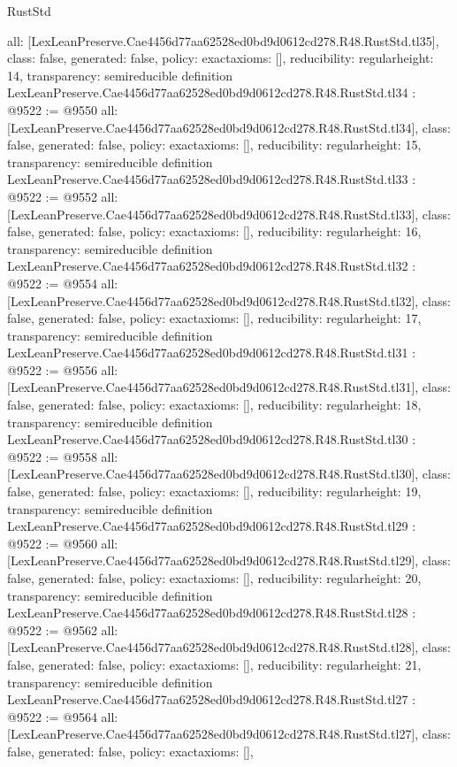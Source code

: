 \begin{lexlean}{RustStd}
\begin{coremodule}
{  all: [LexLeanPreserve.Cae4456d77aa62528ed0bd9d0612cd278.R48.RustStd.tl35],
  class: false,
  generated: false,
  policy: exact{axioms: []},
  reducibility: regular{height: 14},
  transparency: semireducible
}
definition LexLeanPreserve.Cae4456d77aa62528ed0bd9d0612cd278.R48.RustStd.tl34 : @9522 := @9550 {
  all: [LexLeanPreserve.Cae4456d77aa62528ed0bd9d0612cd278.R48.RustStd.tl34],
  class: false,
  generated: false,
  policy: exact{axioms: []},
  reducibility: regular{height: 15},
  transparency: semireducible
}
definition LexLeanPreserve.Cae4456d77aa62528ed0bd9d0612cd278.R48.RustStd.tl33 : @9522 := @9552 {
  all: [LexLeanPreserve.Cae4456d77aa62528ed0bd9d0612cd278.R48.RustStd.tl33],
  class: false,
  generated: false,
  policy: exact{axioms: []},
  reducibility: regular{height: 16},
  transparency: semireducible
}
definition LexLeanPreserve.Cae4456d77aa62528ed0bd9d0612cd278.R48.RustStd.tl32 : @9522 := @9554 {
  all: [LexLeanPreserve.Cae4456d77aa62528ed0bd9d0612cd278.R48.RustStd.tl32],
  class: false,
  generated: false,
  policy: exact{axioms: []},
  reducibility: regular{height: 17},
  transparency: semireducible
}
definition LexLeanPreserve.Cae4456d77aa62528ed0bd9d0612cd278.R48.RustStd.tl31 : @9522 := @9556 {
  all: [LexLeanPreserve.Cae4456d77aa62528ed0bd9d0612cd278.R48.RustStd.tl31],
  class: false,
  generated: false,
  policy: exact{axioms: []},
  reducibility: regular{height: 18},
  transparency: semireducible
}
definition LexLeanPreserve.Cae4456d77aa62528ed0bd9d0612cd278.R48.RustStd.tl30 : @9522 := @9558 {
  all: [LexLeanPreserve.Cae4456d77aa62528ed0bd9d0612cd278.R48.RustStd.tl30],
  class: false,
  generated: false,
  policy: exact{axioms: []},
  reducibility: regular{height: 19},
  transparency: semireducible
}
definition LexLeanPreserve.Cae4456d77aa62528ed0bd9d0612cd278.R48.RustStd.tl29 : @9522 := @9560 {
  all: [LexLeanPreserve.Cae4456d77aa62528ed0bd9d0612cd278.R48.RustStd.tl29],
  class: false,
  generated: false,
  policy: exact{axioms: []},
  reducibility: regular{height: 20},
  transparency: semireducible
}
definition LexLeanPreserve.Cae4456d77aa62528ed0bd9d0612cd278.R48.RustStd.tl28 : @9522 := @9562 {
  all: [LexLeanPreserve.Cae4456d77aa62528ed0bd9d0612cd278.R48.RustStd.tl28],
  class: false,
  generated: false,
  policy: exact{axioms: []},
  reducibility: regular{height: 21},
  transparency: semireducible
}
definition LexLeanPreserve.Cae4456d77aa62528ed0bd9d0612cd278.R48.RustStd.tl27 : @9522 := @9564 {
  all: [LexLeanPreserve.Cae4456d77aa62528ed0bd9d0612cd278.R48.RustStd.tl27],
  class: false,
  generated: false,
  policy: exact{axioms: []},
}
\end{coremodule}
\end{lexlean}
